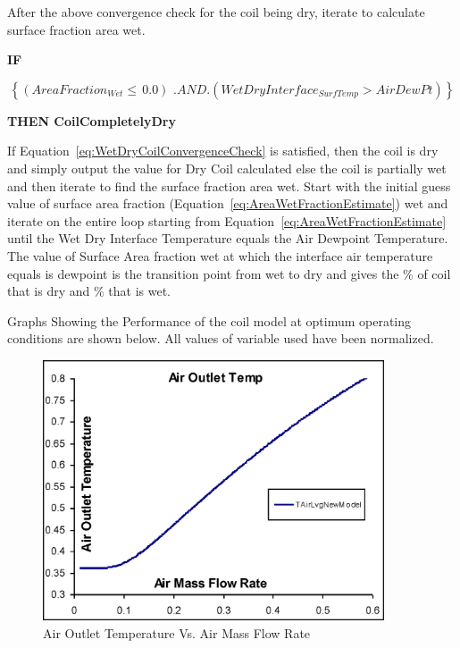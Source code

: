 After the above convergence check for the coil being dry, iterate to calculate surface fraction area wet.

\textbf{IF}

\begin{equation}
\left\{ {(AreaFractio{n_{Wet}} \le \,0.0)\,\,.AND.(WetDryInterfac{e_{SurfTemp}} > AirDewPt)} \right\}
\label{eq:WetDryCoilConvergenceCheck}
\end{equation}

\textbf{THEN CoilCompletelyDry}

If Equation~\ref{eq:WetDryCoilConvergenceCheck} is satisfied, then the coil is dry and simply output the value for Dry Coil calculated else the coil is partially wet and then iterate to find the surface fraction area wet. Start with the initial guess value of surface area fraction (Equation~\ref{eq:AreaWetFractionEstimate}) wet and iterate on the entire loop starting from Equation~\ref{eq:AreaWetFractionEstimate} until the Wet Dry Interface Temperature equals the Air Dewpoint Temperature. The value of Surface Area fraction wet at which the interface air temperature equals is dewpoint is the transition point from wet to dry and gives the \% of coil that is dry and \% that is wet.

Graphs Showing the Performance of the coil model at optimum operating conditions are shown below. All values of variable used have been normalized.

\begin{figure}[hbtp] %
\centering
\includegraphics[width=0.9\textwidth, height=0.9\textheight, keepaspectratio=true]{media/image3348.png}
\caption{Air Outlet Temperature Vs. Air Mass Flow Rate \protect \label{fig:air-outlet-temperature-vs-air-mass-flow-rate}}
\end{figure}


